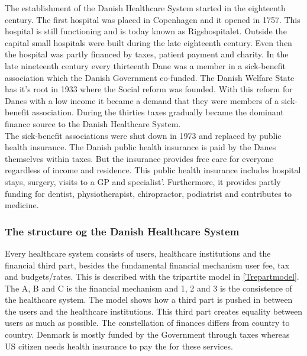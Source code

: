 The establishment of the Danish Healthcare System started in the eighteenth century. The first hospital was placed in Copenhagen and it opened in 1757. This hospital is still functioning and is today known as Rigshospitalet. Outside the capital small hospitals were built during the late eighteenth century. Even then the hospital was partly financed by taxes, patient payment and charity. In the late nineteenth century every thirteenth Dane was a member in a sick-benefit association which the Danish Government co-funded. The Danish Welfare State has it's root in 1933 where the Social reform was founded. With this reform for Danes with a low income it became a demand that they were members of a sick-benefit association. During the thirties taxes gradually became the dominant finance source to the Danish Healthcare System.\\ 
The sick-benefit associations were shut down in 1973 and replaced by public health insurance. The Danish public health insurance is paid by the Danes themselves within taxes. But the insurance provides free care for everyone regardless of income and residence. This public health insurance includes hospital stays, surgery, visits to a GP and specialist'. Furthermore, it provides partly funding for dentist, physiotherapist, chiropractor, podiatrist and contributes to medicine.   \\

\subsubsection{The structure og the Danish Healthcare System}
Every healthcare system consists of users, healthcare institutions and the financial third part, besides the fundamental financial mechanism user fee, tax and budgets/rates. This is described with the tripartite model in \cref{Trepartmodel}. The A, B and C is the financial mechanism and 1, 2 and 3 is the consistence of the healthcare system. The model shows how a third part is pushed in between the users and the healthcare institutions. This third part creates equality between users as much as possible. The constellation of finances differs from country to country. Denmark is mostly funded by the Government through taxes whereas US citizen needs health insurance to pay the for these services\cite{sundhedsvaesen}. \\


